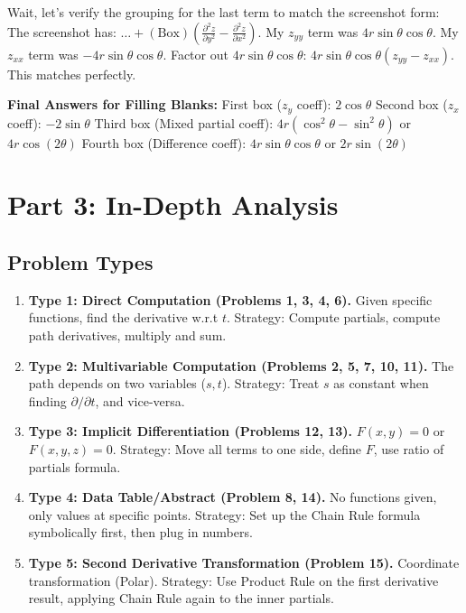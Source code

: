 \documentclass[11pt, letterpaper]{article}
\theoremstyle{definition}
\begin{document}
Wait, let's verify the grouping for the last term to match the screenshot form:
The screenshot has: $\dots + (\text{Box}) \left( \frac{\partial^2 z}{\partial y^2} - \frac{\partial^2 z}{\partial x^2} \right)$.
My $z_{yy}$ term was $4r\sin\theta\cos\theta$. My $z_{xx}$ term was $-4r\sin\theta\cos\theta$.
Factor out $4r\sin\theta\cos\theta$:
$4r\sin\theta\cos\theta (z_{yy} - z_{xx})$. This matches perfectly.

\textbf{Final Answers for Filling Blanks:}
First box ($z_y$ coeff): $\boxed{2\cos\theta}$
Second box ($z_x$ coeff): $\boxed{-2\sin\theta}$
Third box (Mixed partial coeff): $\boxed{4r(\cos^2\theta - \sin^2\theta)}$ or $\boxed{4r\cos(2\theta)}$
Fourth box (Difference coeff): $\boxed{4r\sin\theta\cos\theta}$ or $\boxed{2r\sin(2\theta)}$

\section{Part 3: In-Depth Analysis}

\subsection{Problem Types}
\begin{enumerate}
    \item \textbf{Type 1: Direct Computation (Problems 1, 3, 4, 6).} Given specific functions, find the derivative w.r.t $t$. Strategy: Compute partials, compute path derivatives, multiply and sum.
    \item \textbf{Type 2: Multivariable Computation (Problems 2, 5, 7, 10, 11).} The path depends on two variables ($s,t$). Strategy: Treat $s$ as constant when finding $\partial/\partial t$, and vice-versa.
    \item \textbf{Type 3: Implicit Differentiation (Problems 12, 13).} $F(x,y)=0$ or $F(x,y,z)=0$. Strategy: Move all terms to one side, define $F$, use ratio of partials formula.
    \item \textbf{Type 4: Data Table/Abstract (Problem 8, 14).} No functions given, only values at specific points. Strategy: Set up the Chain Rule formula symbolically first, then plug in numbers.
    \item \textbf{Type 5: Second Derivative Transformation (Problem 15).} Coordinate transformation (Polar). Strategy: Use Product Rule on the first derivative result, applying Chain Rule again to the inner partials.
\end{enumerate}
\end{document}
